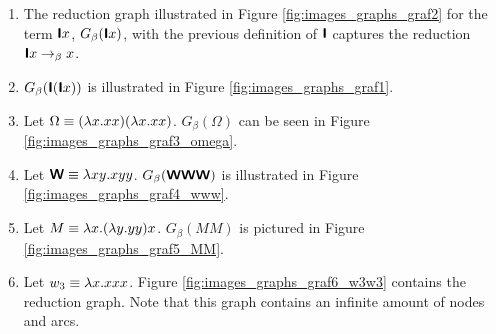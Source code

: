 \begin{example}
	\begin{enumerate}
		\item The reduction graph illustrated in Figure \ref{fig:images_graphs_graf2}
		for the term $\textsf{\textbf{I}} x$, $G_\beta(\textsf{\textbf{I}} x)$, with
		the previous definition of $\textsf{\textbf{I}}$ captures the reduction $\textsf{\textbf{I}} x\rightarrow_\beta x$.
		
		\item $G_\beta(\textsf{\textbf{I}}(\textsf{\textbf{I}} x))$ is illustrated in Figure \ref{fig:images_graphs_graf1}.
		
		\item Let $\Omega\equiv(\lambda x.xx)(\lambda x.xx)$. $G_\beta(\Omega)$
		can be seen in Figure \ref{fig:images_graphs_graf3_omega}.
		
		\item Let $\textsf{\textbf{W}}\equiv\lambda xy.xyy$. $G_\beta(\textsf{\textbf{W}}\textsf{\textbf{W}}\textsf{\textbf{W}})$ is illustrated in
		Figure \ref{fig:images_graphs_graf4_www}.
		
		\item Let $M\equiv\lambda x.(\lambda y.yy)x$. $G_\beta(MM)$ is pictured in
		Figure \ref{fig:images_graphs_graf5_MM}.
		
		\item Let $w_3\equiv\lambda x.xxx$. Figure \ref{fig:images_graphs_graf6_w3w3}
		contains the reduction graph. Note that this graph contains an infinite 
		amount of nodes and arcs.
		

\end{enumerate}
\end{example}
